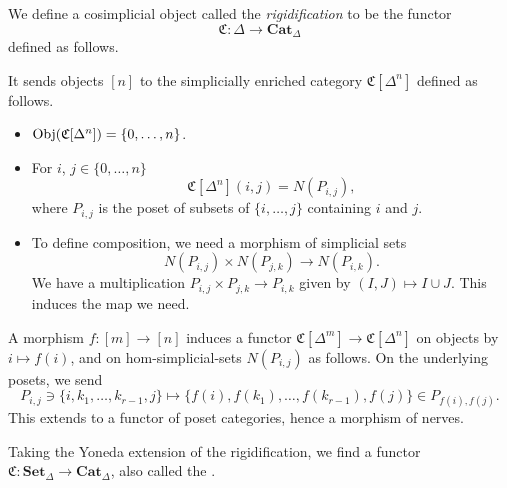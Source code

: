 \begin{definition}[Rigidification]
	\label{def:rigidification}
	We define a cosimplicial object called the \emph{rigidification} to be the functor
	\begin{equation*}
	\mathfrak{C}\colon \Delta \to \mathbf{Cat}_{\Delta}
	\end{equation*}
	defined as follows.
	
	It sends objects $[n]$ to the simplicially enriched category $\mathfrak{C}[\Delta^{n}]$ defined as follows.
	\begin{itemize}
		\item $\operatorname{Obj}(\mathfrak{C}[\Delta^{n}]) = \{0, \ldots, n\}$.
		
		\item For $i$, $j \in \{0, \ldots, n\}$
		\begin{equation*}
		\mathfrak{C}[\Delta^{n}](i, j) = N(P_{i, j}),
		\end{equation*}
		where $P_{i, j}$ is the poset of subsets of $\{i, \ldots, j\}$ containing $i$ and $j$.
		
		\item To define composition, we need a morphism of simplicial sets
		\begin{equation*}
		N(P_{i,j}) \times N(P_{j,k}) \to N(P_{i, k}).
		\end{equation*}
		We have a multiplication $P_{i,j} \times P_{j, k} \to P_{i, k}$ given by $(I, J) \mapsto I \cup J$. This induces the map we need.
	\end{itemize}
	
	A morphism $f\colon [m] \to [n]$ induces a functor $\mathfrak{C}[\Delta^{m}] \to \mathfrak{C}[\Delta^{n}]$ on objects by $i \mapsto f(i)$, and on hom-simplicial-sets $N(P_{i,j})$ as follows. On the underlying posets, we send
	\begin{equation*}
	P_{i,j} \ni \{ i, k_{1}, \ldots, k_{r-1}, j \} \mapsto \{f(i), f(k_{1}), \ldots, f(k_{r-1}), f(j)\} \in P_{f(i),f(j)}.
	\end{equation*}
	This extends to a functor of poset categories, hence a morphism of nerves.
	
	Taking the Yoneda extension of the rigidification, we find a functor $\mathfrak{C}\colon \mathbf{Set}_{\Delta} \to \mathbf{Cat}_{\Delta}$, also called the .
\end{definition}

